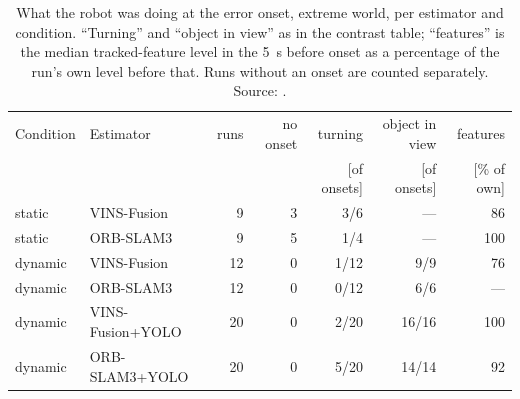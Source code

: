 \begin{table}[htbp]
\centering
\small
\caption[What the robot was doing at the onset, extreme world.]{What the robot was doing at the error onset, extreme world, per estimator and condition. ``Turning'' and ``object in view'' as in the contrast table; ``features'' is the median tracked-feature level in the \SI{5}{\second} before onset as a percentage of the run's own level before that. Runs without an onset are counted separately. Source: .}
\label{tab:insight-onset-extreme}
\begin{tabular}{llrrrrr}
\toprule
Condition & Estimator & runs & no onset & turning & object in view & features \\
 & & & & [of onsets] & [of onsets] & [\si{\percent} of own] \\
\midrule
static & VINS-Fusion & 9 & 3 & 3/6 & --- & 86 \\
static & ORB-SLAM3 & 9 & 5 & 1/4 & --- & 100 \\
dynamic & VINS-Fusion & 12 & 0 & 1/12 & 9/9 & 76 \\
dynamic & ORB-SLAM3 & 12 & 0 & 0/12 & 6/6 & --- \\
dynamic & VINS-Fusion+YOLO & 20 & 0 & 2/20 & 16/16 & 100 \\
dynamic & ORB-SLAM3+YOLO & 20 & 0 & 5/20 & 14/14 & 92 \\
\bottomrule
\end{tabular}
\end{table}

